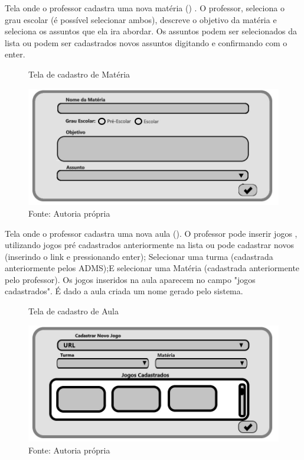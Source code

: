 \documentclass{utfpr-pg}
\begin{document}
    Tela onde o professor cadastra uma nova matéria () . O professor, seleciona o grau escolar (é possível selecionar ambos), descreve o objetivo da matéria e seleciona os assuntos que ela ira abordar. Os assuntos podem ser selecionados da lista ou podem ser cadastrados novos assuntos digitando e confirmando com o enter. 
       
        \begin{figure}[H]
            \centering
            \captionsetup{width=0.9\textwidth}
            \caption{Tela de cadastro de Matéria}
            \includegraphics[width=\linewidth]{fotos/7.jpg}
            \caption*{Fonte: Autoria própria}
            \label{fig:7}
        \end{figure}
    
    Tela onde o professor cadastra uma nova aula (). O professor pode inserir jogos , utilizando jogos pré cadastrados anteriormente na lista ou pode cadastrar novos (inserindo o link e pressionando enter); Selecionar uma turma (cadastrada anteriormente pelos ADMS);E selecionar uma Matéria (cadastrada anteriormente pelo professor). Os jogos inseridos na aula aparecem no campo "jogos cadastrados". É dado a aula criada um nome gerado pelo sistema.
      \begin{figure}[H]
            \centering
            \captionsetup{width=0.9\textwidth}
            \caption{Tela de cadastro de Aula}
            \includegraphics[width=\linewidth]{fotos/8.jpg}
            \caption*{Fonte: Autoria própria}
            \label{fig:8}
        \end{figure}
        
\end{document}

